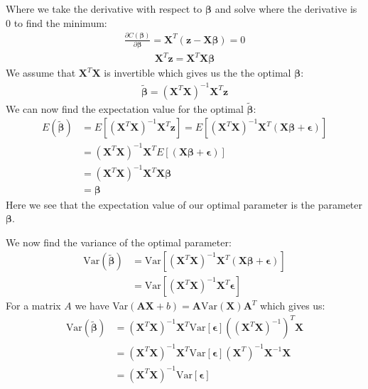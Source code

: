 \documentclass[norsk,a4paper,11pt]{scrartcl}
\begin{document}
Where we take the derivative with respect to $\boldsymbol{\beta}$ and solve where the derivative is 0 to find the minimum:
\begin{align*}
  \frac{\partial C(\boldsymbol{\beta})}{\partial \boldsymbol{\beta}} = \boldsymbol{X}^T (\boldsymbol{z}- \boldsymbol{X}\boldsymbol{\beta}) =0
\end{align*}
\begin{align*}
  \boldsymbol{X}^T\boldsymbol{z} = \boldsymbol{X}^T \boldsymbol{X}\boldsymbol{\beta}
\end{align*}
We assume that $\boldsymbol{X}^T\boldsymbol{X}$ is invertible which gives us the the optimal $\boldsymbol{\beta}$:
\begin{align*}
  \boldsymbol{\tilde{\beta}} = (\boldsymbol{X}^T\boldsymbol{X})^{-1} \boldsymbol{X}^T\boldsymbol{z}
\end{align*}
We can now find the expectation value for the optimal $\boldsymbol{\tilde{\beta}}$:
\begin{align*}
  E(\boldsymbol{\tilde{\beta}}) &= E[(\boldsymbol{X}^T\boldsymbol{X})^{-1} \boldsymbol{X}^T\boldsymbol{z}] = E[(\boldsymbol{X}^T\boldsymbol{X})^{-1} \boldsymbol{X}^T(\boldsymbol{X}\boldsymbol{\beta} + \boldsymbol {\epsilon} )] \\
  &=  (\boldsymbol{X}^T\boldsymbol{X})^{-1} \boldsymbol{X}^TE[(\boldsymbol{X}\boldsymbol{\beta} + \boldsymbol {\epsilon} )] \\ &= (\boldsymbol{X}^T\boldsymbol{X})^{-1} \boldsymbol{X}^T\boldsymbol{X}\boldsymbol{\beta} \\&=  \boldsymbol{\beta}
\end{align*}
Here we see that the expectation value of our optimal parameter is the parameter $\boldsymbol{\beta}$.

We now find the variance of the optimal parameter:
\begin{align*}
  \text{Var}(\boldsymbol{\tilde{\beta}}) &= \text{Var}[(\boldsymbol{X}^T\boldsymbol{X})^{-1} \boldsymbol{X}^T(\boldsymbol{X}\boldsymbol{\beta} + \boldsymbol {\epsilon} )] \\
  &= \text{Var}[(\boldsymbol{X}^T\boldsymbol{X})^{-1} \boldsymbol{X}^T\boldsymbol {\epsilon} ]
\end{align*}
For a matrix $A$ we have Var$(\boldsymbol{AX}+b) = \boldsymbol{A}\text{Var}(\boldsymbol{X})\boldsymbol{A}^T$ which gives us:
\begin{align*}
  \text{Var}(\boldsymbol{\tilde{\beta}})&=(\boldsymbol{X}^T\boldsymbol{X})^{-1}\boldsymbol{X}^T\text{Var}[ {\boldsymbol{\epsilon}} ]((\boldsymbol{X}^T\boldsymbol{X})^{-1})^T\boldsymbol{X} \\  &=
  (\boldsymbol{X}^T\boldsymbol{X})^{-1}\boldsymbol{X}^T\text{Var}[ {\boldsymbol{\epsilon}} ](\boldsymbol{X}^T)^{-1}\boldsymbol{X}^{-1}\boldsymbol{X} \\&=
   (\boldsymbol{X}^T\boldsymbol{X})^{-1}\text{Var}[ {\boldsymbol{\epsilon}} ]
\end{align*}
\end{document}
